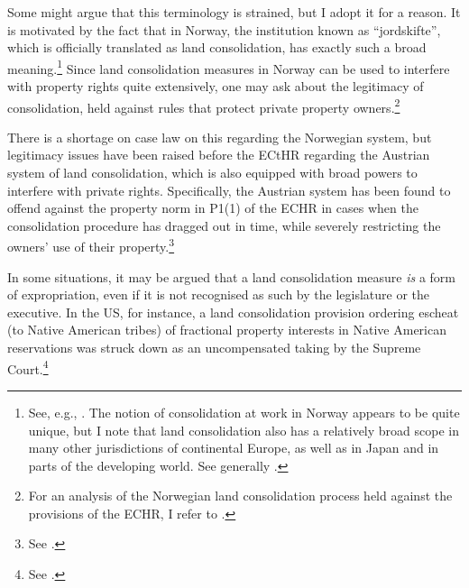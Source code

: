Some might argue that this terminology is strained, but I adopt it for a reason. It is motivated by the fact that in Norway, the institution known as ``jordskifte'', which is officially translated as land consolidation, has exactly such a broad meaning.\footnote{See, e.g., \cite{reiten09,rognes03}. The notion of consolidation at work in Norway appears to be quite unique, but I note that land consolidation also has a relatively broad scope in many other jurisdictions of continental Europe, as well as in Japan and in parts of the developing world. See generally \cite{sky07,vitikainen04}.} Since land consolidation measures in Norway can be used to interfere with property rights quite extensively, one may ask about the legitimacy of consolidation, held against rules that protect private property owners.\footnote{For an analysis of the Norwegian land consolidation process held against the provisions of the ECHR, I refer to \cite{utgard09}.} 

There is a shortage on case law on this regarding the Norwegian system, but legitimacy issues have been raised before the ECtHR regarding the Austrian system of land consolidation, which is also equipped with broad powers to interfere with private rights. Specifically, the Austrian system has been found to offend against the property norm in P1(1) of the ECHR in cases when the consolidation procedure has dragged out in time, while severely restricting the owners' use of their property.\footnote{See \cite{erkner87,poiss87}.} 

In some situations, it may be argued that a land consolidation measure {\it is} a form of expropriation, even if it is not recognised as such by the legislature or the executive. In the US, for instance, a land consolidation provision ordering escheat (to Native American tribes) of fractional property interests in Native American reservations was struck down as an uncompensated taking by the Supreme Court.\footnote{See \cite{hodel87}.}

